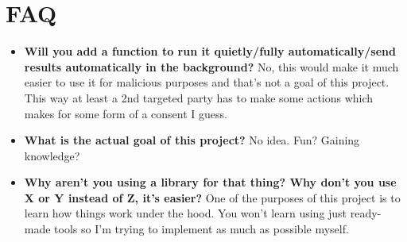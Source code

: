 \chapter{FAQ}
\begin{itemize}
  \item \textbf{Will you add a function to run it quietly/fully automatically/send results automatically in the background?} No, this would make it much easier to use it for malicious purposes and that's not a goal of this project. This way at least a 2nd targeted party has to make some actions which makes for some form of a consent I guess.
  \item \textbf{What is the actual goal of this project?} No idea. Fun? Gaining knowledge?
  \item \textbf{Why aren't you using a library for that thing? Why don't you use X or Y instead of Z, it's easier?} One of the purposes of this project is to learn how things work under the hood. You won't learn using just ready-made tools so I'm trying to implement as much as possible myself.
\end{itemize}